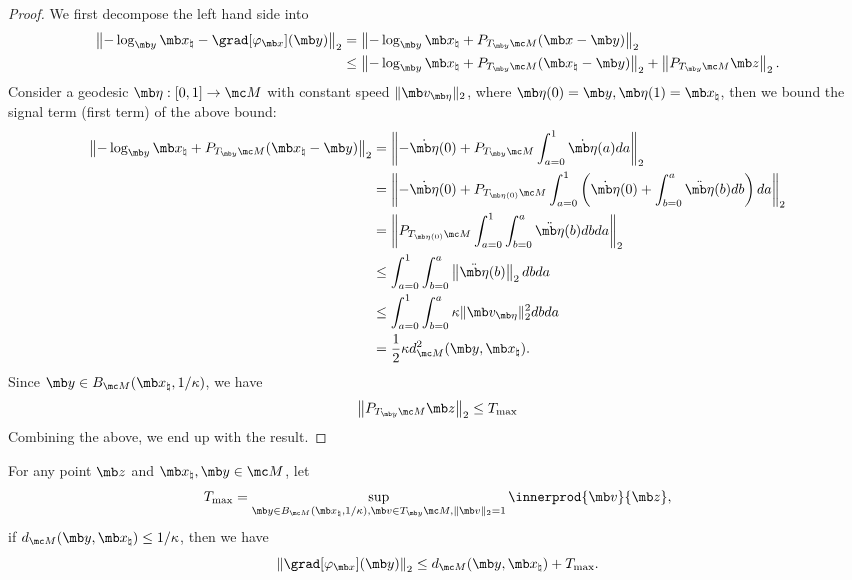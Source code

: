 \begin{proof}
We first decompose the left hand side into
\begin{equation}
    \begin{aligned}
        \left\|-\log_{\mb y}\mb x_\natural - \grad[\varphi_{\mb x}](\mb y)\right\|_2
        &= \left\| -\log_{\mb y}\mb x_\natural + P_{T_{\mb y}\mc M} (\mb x-\mb y)\right\|_2\\
        &\leq \left\| -\log_{\mb y}\mb x_\natural + P_{T_{\mb y}\mc M} (\mb x_\natural -\mb y) \right\|_2 + \left\| P_{T_{\mb y}\mc M} \mb z \right\|_2.
    \end{aligned}
\end{equation}
 Consider a geodesic $\mb\eta:[0,1] \rightarrow \mc M$ with constant speed $\|\mb v_{\mb\eta}\|_2$, where $\mb\eta(0)=\mb y, \mb\eta(1)=\mb x_\natural$,
then we bound the signal term (first term) of the above bound:
\begin{equation}
    \begin{aligned}
        \left\| -\log_{\mb y}\mb x_\natural + P_{T_{\mb y}\mc M} (\mb x_\natural -\mb y) \right\|_2
        &= \left\| -\Dot{\mb\eta}(0) + P_{T_{\mb y}\mc M} \int_{a=0}^1 \Dot{\mb\eta}(a) da\right\|_2\\
        &=\left\| -\Dot{\mb\eta}(0) + P_{T_{\mb\eta(0)}\mc M} \int_{a=0}^1 \left(\Dot{\mb\eta}(0) + \int_{b=0}^a \Ddot{\mb\eta}(b) db\right) da \right\|_2\\
        &=\left\| P_{T_{\mb\eta(0)}\mc M} \int_{a=0}^1 \int_{b=0}^a \Ddot{\mb\eta}(b) db da\right\|_2\\
        &\leq \int_{a=0}^1 \int_{b=0}^a \left\|\Ddot{\mb\eta}(b) \right\|_2 db da\\
        &\leq \int_{a=0}^1 \int_{b=0}^a \kappa \|\mb v_{\mb \eta}\|_2^2  db da\\
        &=\frac{1}{2} \kappa d_{\mc M}^2 (\mb y, \mb x_\natural).
    \end{aligned}
\end{equation}
Since $\mb y \in B_{\mc M}(\mb x_\natural, 1/\kappa)$, we have 
\begin{equation}
    \begin{aligned}
        \left\| P_{T_{\mb y}\mc M} \mb z\right\|_2
        \leq T_{\max}
    \end{aligned}
\end{equation}
Combining the above, we end up with the result.
\end{proof}


\begin{lemma}\label{lemma:grad-bound} 
For any point $\mb z$ and $\mb x_\natural, \mb y \in \mc M$, let
\begin{equation}
    T_{\max} = \sup_{\mb y \in B_{\mc M}(\mb x_\natural, 1/\kappa), \mb v \in T_{\mb y } \mc M, \| \mb v \|_2 =1} \innerprod{\mb v}{\mb z},
\end{equation}
if $d_{\mc M}(\mb y, \mb x_\natural ) \le 1/\kappa$,  then we have
    \begin{equation}
        \left\|\grad[\varphi_{\mb x}](\mb y) \right\|_2\leq d_{\mc M}(\mb y,\mb x_\natural) + T_{\max}.
    \end{equation}
\end{lemma}

